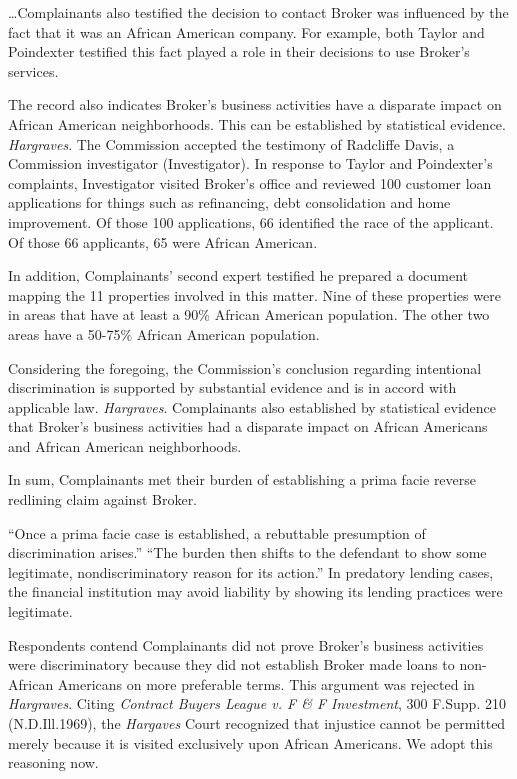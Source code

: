 \dots Complainants also testified the decision to contact Broker was
influenced by the fact that it was an African American company. For example,
both Taylor and Poindexter testified this fact played a role in their decisions
to use Broker's services. 

The record also indicates Broker's business activities have a disparate impact
on African American neighborhoods. This can be established by statistical
evidence. \textit{Hargraves}. The Commission accepted the testimony of
Radcliffe Davis, a Commission investigator (Investigator). In response to
Taylor and Poindexter's complaints, Investigator visited Broker's office and
reviewed 100 customer loan applications for things such as refinancing, debt
consolidation and home improvement. Of those 100 applications, 66 identified
the race of the applicant. Of those 66 applicants, 65 were African American. 

In addition, Complainants' second expert testified he prepared a document
mapping the 11 properties involved in this matter. Nine of these properties
were in areas that have at least a 90\% African American population. The other
two areas have a 50-75\% African American population.

Considering the foregoing, the Commission's conclusion regarding intentional
discrimination is supported by substantial evidence and is in accord with
applicable law. \textit{Hargraves}. Complainants also established by
statistical evidence that Broker's business activities had a disparate impact
on African Americans and African American neighborhoods. 

In sum, Complainants met their burden of establishing a prima facie reverse
redlining claim against Broker. 


``Once a prima facie case is established, a rebuttable presumption of
discrimination arises.'' ``The burden then shifts to the defendant to show some
legitimate, nondiscriminatory reason for its action.'' In predatory lending
cases, the financial institution may avoid liability by showing its lending
practices were legitimate. 

Respondents contend Complainants did not prove Broker's business activities were
discriminatory because they did not establish Broker made loans to non-African
Americans on more preferable terms. This argument was rejected in
\textit{Hargraves}. Citing
\textit{Contract Buyers League v. F \& F Investment},
300 F.Supp. 210 (N.D.Ill.1969), the \textit{Hargaves} Court recognized that
injustice cannot be permitted merely because it is visited exclusively upon
African Americans. We adopt this reasoning now.

